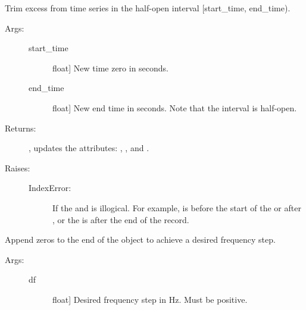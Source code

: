 \documentclass[letterpaper,10pt,english,openany,oneside]{sphinxmanual}
\begin{document}
\begin{fulllineitems}
\begin{fulllineitems}
\end{fulllineitems}


\begin{fulllineitems}
\label{\detokenize{index:sigpropy.TimeSeries.trim}}
Trim excess from time series in the half-open interval
{[}start\_time, end\_time).
\begin{description}
\item[{Args:}] \leavevmode\begin{description}
\item[{start\_time}] \leavevmode{[}float{]}
New time zero in seconds.

\item[{end\_time}] \leavevmode{[}float{]}
New end time in seconds. Note that the interval is
half-open.

\end{description}

\item[{Returns:}] \leavevmode
{}, updates the attributes: , , and
.

\item[{Raises:}] \leavevmode\begin{description}
\item[{IndexError:}] \leavevmode
If the  and  is illogical.
For example,  is before the start of the
 or after , or the  is
after the end of the record.

\end{description}

\end{description}

\end{fulllineitems}


\begin{fulllineitems}
\label{\detokenize{index:sigpropy.TimeSeries.zero_pad}}
Append zeros to the end of the  object to achieve a
desired frequency step.
\begin{description}
\item[{Args:}] \leavevmode\begin{description}
\item[{df}] \leavevmode{[}float{]}
Desired frequency step in Hz. Must be positive.


\end{description}
\end{description}
\end{fulllineitems}
\end{fulllineitems}
\end{document}
